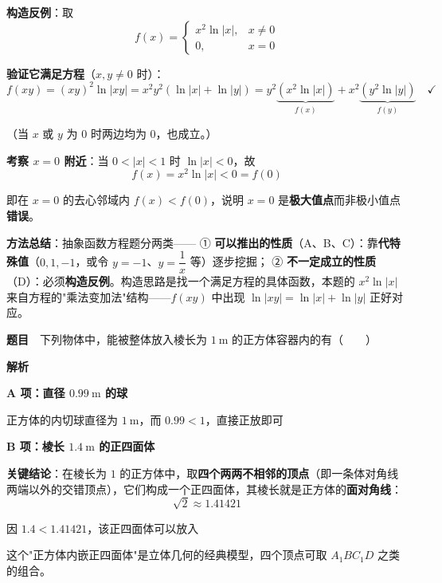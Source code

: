 \textbf{构造反例}：取
\[f(x)=\begin{cases}x^{2}\ln|x|,&x\ne0\\ 0,&x=0\end{cases}\]

\textbf{验证它满足方程}（$x,y\ne0$ 时）：
\[f(xy)=(xy)^{2}\ln|xy|=x^{2}y^{2}\left(\ln|x|+\ln|y|\right)=y^{2}\underbrace{\left(x^{2}\ln|x|\right)}_{f(x)}+x^{2}\underbrace{\left(y^{2}\ln|y|\right)}_{f(y)}\quad\checkmark\]

（当 $x$ 或 $y$ 为 $0$ 时两边均为 $0$，也成立。）

\textbf{考察 $x=0$ 附近}：当 $0<|x|<1$ 时 $\ln|x|<0$，故
\[f(x)=x^{2}\ln|x|<0=f(0)\]

即在 $x=0$ 的去心邻域内 $f(x)<f(0)$，说明 $x=0$ 是\textbf{极大值点}而非极小值点  \textbf{错误}。


\begin{gktip}
\textbf{方法总结}：抽象函数方程题分两类——
① \textbf{可以推出的性质}（A、B、C）：靠\textbf{代特殊值}（$0,1,-1$，或令 $y=-1$、$y=\dfrac1x$ 等）逐步挖掘；
② \textbf{不一定成立的性质}（D）：必须\textbf{构造反例}。构造思路是找一个满足方程的具体函数，本题的 $x^2\ln|x|$ 来自方程的"乘法变加法"结构——$f(xy)$ 中出现 $\ln|xy|=\ln|x|+\ln|y|$ 正好对应。
\end{gktip}

\par\medskip


\textbf{题目}　下列物体中，能被整体放入棱长为 $1\ \mathrm m$ 的正方体容器内的有（　　）

\textbf{解析}

\par\medskip

\textbf{A 项：直径 $0.99\ \mathrm m$ 的球 }

正方体的内切球直径为 $1\ \mathrm m$，而 $0.99<1$，直接正放即可 

\par\medskip

\textbf{B 项：棱长 $1.4\ \mathrm m$ 的正四面体 }

\textbf{关键结论}：在棱长为 $1$ 的正方体中，取\textbf{四个两两不相邻的顶点}（即一条体对角线两端以外的交错顶点），它们构成一个正四面体，其棱长就是正方体的\textbf{面对角线}：
\[\sqrt2\approx1.41421\]

因 $1.4<1.41421$，该正四面体可以放入 

\begin{gktip}
这个"正方体内嵌正四面体"是立体几何的经典模型，四个顶点可取 $A_1BC_1D$ 之类的组合。
\end{gktip}

